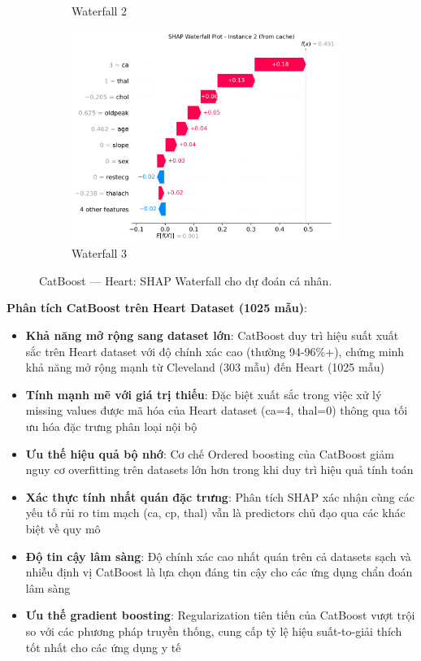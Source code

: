 \begin{figure}[H]
\begin{subfigure}[b]{0.31\textwidth}
\caption{Waterfall 2}
\label{fig:cat_heart_waterfall2}
\end{subfigure}\hfill
\begin{subfigure}[b]{0.31\textwidth}
\centering
\includegraphics[width=0.95\textwidth]{Result/heart_dataset/Catboost/SHAP/Waterfall 3.png}
\caption{Waterfall 3}
\label{fig:cat_heart_waterfall3}
\end{subfigure}
\caption{CatBoost — Heart: SHAP Waterfall cho dự đoán cá nhân.}
\label{fig:cat_heart_waterfalls}
\end{figure}

\textbf{Phân tích CatBoost trên Heart Dataset (1025 mẫu)}:
\begin{itemize}[leftmargin=*]
    \item \textbf{Khả năng mở rộng sang dataset lớn}: CatBoost duy trì hiệu suất xuất sắc trên Heart dataset với độ chính xác cao (thường 94-96\%+), chứng minh khả năng mở rộng mạnh từ Cleveland (303 mẫu) đến Heart (1025 mẫu)
    \item \textbf{Tính mạnh mẽ với giá trị thiếu}: Đặc biệt xuất sắc trong việc xử lý missing values được mã hóa của Heart dataset (ca=4, thal=0) thông qua tối ưu hóa đặc trưng phân loại nội bộ
    \item \textbf{Ưu thế hiệu quả bộ nhớ}: Cơ chế Ordered boosting của CatBoost giảm nguy cơ overfitting trên datasets lớn hơn trong khi duy trì hiệu quả tính toán
    \item \textbf{Xác thực tính nhất quán đặc trưng}: Phân tích SHAP xác nhận cùng các yếu tố rủi ro tim mạch (ca, cp, thal) vẫn là predictors chủ đạo qua các khác biệt về quy mô
    \item \textbf{Độ tin cậy lâm sàng}: Độ chính xác cao nhất quán trên cả datasets sạch và nhiễu định vị CatBoost là lựa chọn đáng tin cậy cho các ứng dụng chẩn đoán lâm sàng
    \item \textbf{Ưu thế gradient boosting}: Regularization tiên tiến của CatBoost vượt trội so với các phương pháp truyền thống, cung cấp tỷ lệ hiệu suất-to-giải thích tốt nhất cho các ứng dụng y tế
\end{itemize}

